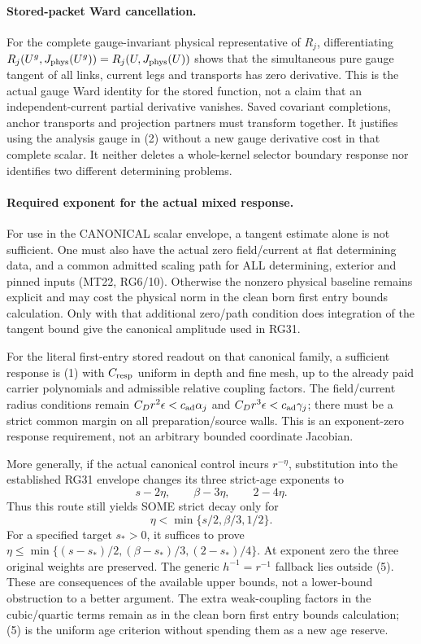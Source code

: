 \documentclass[11pt]{article}
\begin{document}
\paragraph{Stored-packet Ward cancellation.}
For the complete gauge-invariant physical representative of $R_j$, differentiating
$R_j(U^g,J_{\rm phys}(U^g))=R_j(U,J_{\rm phys}(U))$ shows that the simultaneous
pure gauge tangent of all links, current legs and transports has zero derivative.
This is the actual gauge Ward identity for the stored function, not a claim that
an independent-current partial derivative vanishes. Saved covariant completions,
anchor transports and projection partners must transform together. It justifies
using the analysis gauge in (2) without a new gauge derivative cost in that
complete scalar. It neither deletes a whole-kernel selector boundary response nor
identifies two different determining problems.

\paragraph{Required exponent for the actual mixed response.}
For use in the CANONICAL scalar envelope, a tangent estimate alone is not
sufficient. One must also have the actual zero field/current at flat determining
data, and a common admitted scaling path for ALL determining, exterior and
pinned inputs (MT22, RG6/10). Otherwise the nonzero physical baseline remains
explicit and may cost the physical norm in the clean born first entry bounds calculation. Only with that additional
zero/path condition does integration of the tangent bound give the canonical
amplitude used in RG31.

For the literal first-entry stored readout on that canonical family, a sufficient response is (1) with
$C_{\rm resp}$ uniform in depth and fine mesh, up to the already paid carrier
polynomials and admissible relative coupling factors. The field/current radius
conditions remain $C_Dr^2\epsilon< c_{\rm ad}\alpha_j$ and
$C_Dr^3\epsilon<c_{\rm ad}\gamma_j$; there must be a strict common margin on
all preparation/source walls. This is an exponent-zero response requirement,
not an arbitrary bounded coordinate Jacobian.

More generally, if the actual canonical control incurs $r^{-\eta}$, substitution
into the established RG31 envelope changes its three strict-age exponents to
\[
 s-2\eta,\qquad \beta-3\eta,\qquad 2-4\eta.             \tag{4}
\]
Thus this route still yields SOME strict decay only for
\[
 \eta<\min\{s/2,\beta/3,1/2\}.                         \tag{5}
\]
For a specified target $s_*>0$, it suffices to prove
$\eta\le\min\{(s-s_*)/2,(\beta-s_*)/3,(2-s_*)/4\}$.
At exponent zero the three original weights are preserved. The generic
$h^{-1}=r^{-1}$ fallback lies outside (5). These are consequences of the
available upper bounds, not a lower-bound obstruction to a better argument.
The extra weak-coupling factors in the cubic/quartic terms remain as in the clean born first entry bounds calculation;
(5) is the uniform age criterion without spending them as a new age reserve.
\end{document}

